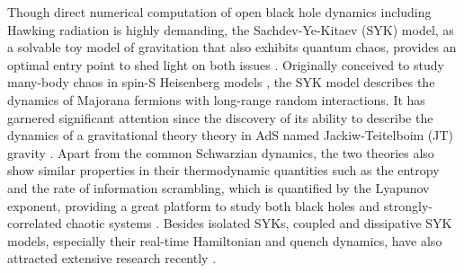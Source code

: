 \documentclass[prl,superscriptaddress,notitlepage,showpacs,twocolumn]{revtex4-2}
\begin{document}
Though direct numerical computation of open black hole dynamics including Hawking radiation is highly demanding, the Sachdev-Ye-Kitaev (SYK) model, as a solvable toy model of gravitation that also exhibits quantum chaos, provides an optimal entry point to shed light on both issues %
\cite{sachdev1993gapless,Kitaev,maldacena2016remarks,gu2017local}. Originally conceived to study many-body chaos in spin-S Heisenberg models \cite{sachdev1993gapless}, the SYK model describes the dynamics of Majorana fermions with long-range random interactions. %
It has garnered significant attention since the discovery of its ability to describe the dynamics of a gravitational theory theory in AdS named Jackiw-Teitelboim (JT) gravity \cite{Kitaev}. Apart from the common Schwarzian dynamics, the two theories also show similar properties in their thermodynamic quantities such as the entropy and the rate of information scrambling, which is quantified by the Lyapunov exponent, providing a great platform to study both black holes and strongly-correlated chaotic systems \cite{scaffidi2019chaos,maldacena2016bound,gu2017local,polchinski2016spectrum,shenker2014multiple,touil2021information}. %
Besides isolated SYKs, coupled and dissipative SYK models, especially their real-time Hamiltonian and quench dynamics, have also attracted extensive research recently \cite{chen2017tunable,garcia2021euclidean,garcia2023keldysh,garcia2022dominance,zhang2019evaporation,zanoci2022energy,eberlein2017quantum,almheiri2024universal,maldacena2021syk,cheipesh2021quantum,bhattacharya2019quantum,sa2022lindbladian,kawabata2023dynamical,wang2024entanglement}. %
\end{document}
